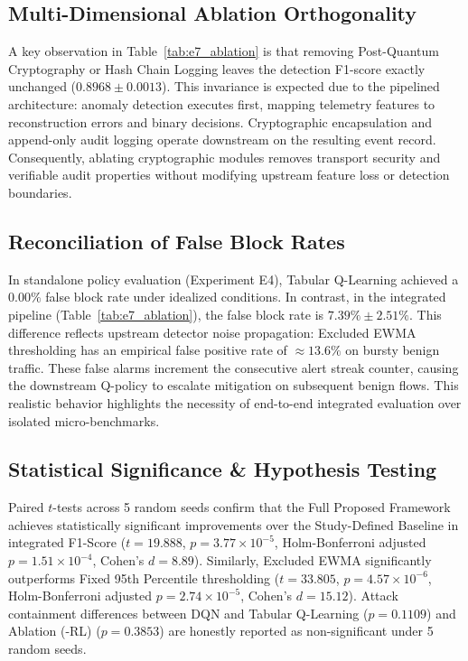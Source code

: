 \documentclass[journal]{IEEEtran}
\begin{document}
\subsection{Multi-Dimensional Ablation Orthogonality}
A key observation in Table~\ref{tab:e7_ablation} is that removing Post-Quantum Cryptography or Hash Chain Logging leaves the detection F1-score exactly unchanged ($0.8968 \pm 0.0013$). This invariance is expected due to the pipelined architecture: anomaly detection executes first, mapping telemetry features to reconstruction errors and binary decisions. Cryptographic encapsulation and append-only audit logging operate downstream on the resulting event record. Consequently, ablating cryptographic modules removes transport security and verifiable audit properties without modifying upstream feature loss or detection boundaries.

\subsection{Reconciliation of False Block Rates}
In standalone policy evaluation (Experiment E4), Tabular Q-Learning achieved a $0.00\%$ false block rate under idealized conditions. In contrast, in the integrated pipeline (Table~\ref{tab:e7_ablation}), the false block rate is $7.39\% \pm 2.51\%$. This difference reflects upstream detector noise propagation: Excluded EWMA thresholding has an empirical false positive rate of $\approx 13.6\%$ on bursty benign traffic. These false alarms increment the consecutive alert streak counter, causing the downstream Q-policy to escalate mitigation on subsequent benign flows. This realistic behavior highlights the necessity of end-to-end integrated evaluation over isolated micro-benchmarks.

\subsection{Statistical Significance \& Hypothesis Testing}
Paired $t$-tests across 5 random seeds confirm that the Full Proposed Framework achieves statistically significant improvements over the Study-Defined Baseline in integrated F1-Score ($t = 19.888$, $p = 3.77 \times 10^{-5}$, Holm-Bonferroni adjusted $p = 1.51 \times 10^{-4}$, Cohen's $d = 8.89$). Similarly, Excluded EWMA significantly outperforms Fixed 95th Percentile thresholding ($t = 33.805$, $p = 4.57 \times 10^{-6}$, Holm-Bonferroni adjusted $p = 2.74 \times 10^{-5}$, Cohen's $d = 15.12$). Attack containment differences between DQN and Tabular Q-Learning ($p = 0.1109$) and Ablation (-RL) ($p = 0.3853$) are honestly reported as non-significant under 5 random seeds.
\end{document}
